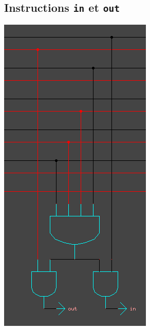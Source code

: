 \documentclass[11pt, a4paper, twoside, titlepage]{article}
\begin{document}
\subsection{Instructions \texttt{in} et \texttt{out}}
\centerline{\includegraphics[scale=.5]{log_in_out}}
\end{document}

